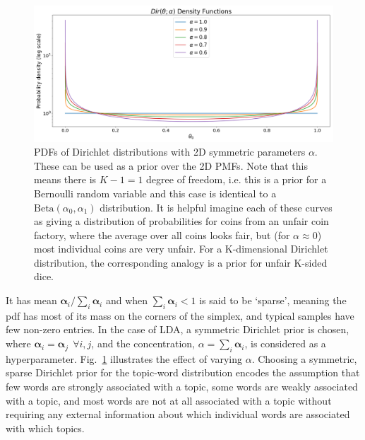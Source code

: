 \begin{figure}
	\centering
	\includegraphics[width=0.91\columnwidth]{figures/beta.png}
	\caption{
		PDFs of Dirichlet distributions with 2D symmetric parameters $\alpha$. These can be used as a prior over the 2D PMFs. Note that this means there is $K-1 = 1$ degree of freedom, i.e. this is a prior for a Bernoulli random variable and this case is identical to a $\mathrm{Beta}(\alpha_0, \alpha_1)$ distribution. It is helpful imagine each of these curves as giving a distribution of probabilities for coins from an unfair coin factory, where the average over all coins looks fair, but (for $\alpha \approx 0$) most individual coins are very unfair. For a K-dimensional Dirichlet distribution, the corresponding analogy is a prior for unfair K-sided dice.
	}
	\label{fig:beta-pdf}

\end{figure}


It has mean $\boldsymbol{\alpha}_i / \sum_i \boldsymbol{\alpha}_i$ and when $\sum_i \boldsymbol{\alpha}_i < 1$ is said to be `sparse', meaning the pdf has most of its mass on the corners of the simplex, and typical samples have few non-zero entries. In the case of LDA, a symmetric Dirichlet prior is chosen, where $\boldsymbol{\alpha}_i = \boldsymbol{\alpha}_j ~~\forall i, j$, and the concentration, $\alpha = \sum_i \boldsymbol{\alpha}_i$, is considered as a hyperparameter. Fig.~\ref{fig:beta-pdf} illustrates the effect of varying $\alpha$. Choosing a symmetric, sparse Dirichlet prior for the topic-word distribution encodes the assumption that few words are strongly associated with a topic, some words are weakly associated with a topic, and most words are not at all associated with a topic without requiring any external information about which individual words are associated with which topics.


